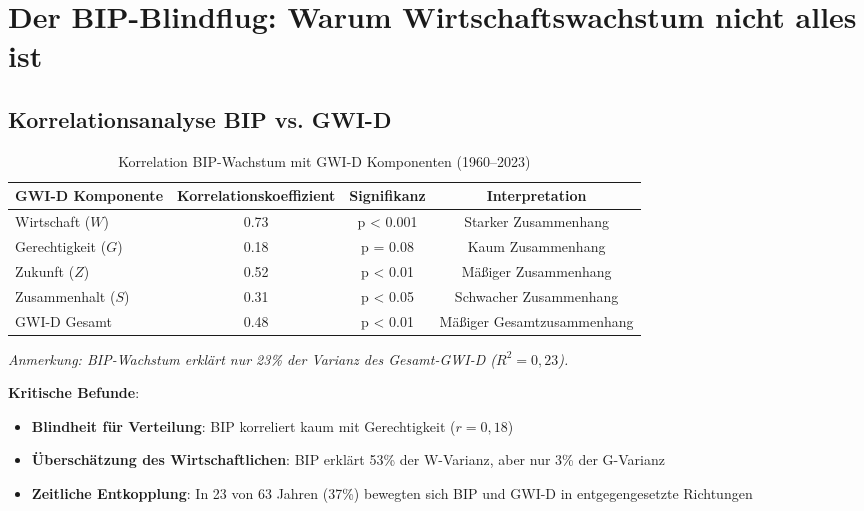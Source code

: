 \section{Der BIP-Blindflug: Warum Wirtschaftswachstum nicht alles ist}

\subsection{Korrelationsanalyse BIP vs. GWI-D}

\begin{table}[ht]
    \centering
    \caption{Korrelation BIP-Wachstum mit GWI-D Komponenten (1960–2023)}
    \label{tab:korrelation_bip_gwi}
    \begin{tabular}{lccc}
        \toprule
        \textbf{GWI-D Komponente} & \textbf{Korrelationskoeffizient} & \textbf{Signifikanz} & \textbf{Interpretation} \\
        \midrule
        Wirtschaft (\(W\)) & 0.73 & p < 0.001 & Starker Zusammenhang \\
        Gerechtigkeit (\(G\)) & 0.18 & p = 0.08 & Kaum Zusammenhang \\
        Zukunft (\(Z\)) & 0.52 & p < 0.01 & Mäßiger Zusammenhang \\
        Zusammenhalt (\(S\)) & 0.31 & p < 0.05 & Schwacher Zusammenhang \\
        GWI-D Gesamt & 0.48 & p < 0.01 & Mäßiger Gesamtzusammenhang \\
        \bottomrule
    \end{tabular}
\end{table}

\begin{flushleft}
\footnotesize{\textit{Anmerkung: BIP-Wachstum erklärt nur 23\% der Varianz des Gesamt-GWI-D (\(R^2 = 0,23\)).}}
\end{flushleft}

\textbf{Kritische Befunde}:

\begin{itemize}
    \item \textbf{Blindheit für Verteilung}: BIP korreliert kaum mit Gerechtigkeit (\(r = 0,18\))
    \item \textbf{Überschätzung des Wirtschaftlichen}: BIP erklärt 53\% der W-Varianz, aber nur 3\% der G-Varianz
    \item \textbf{Zeitliche Entkopplung}: In 23 von 63 Jahren (37\%) bewegten sich BIP und GWI-D in entgegengesetzte Richtungen
\end{itemize}


